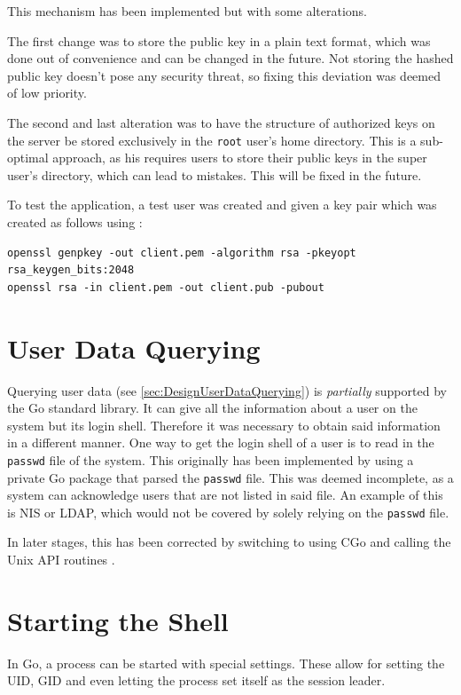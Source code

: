 \documentclass[10pt,a4paper,titlepage,twoside,english,final]{zhawreprt}
\begin{document}
This mechanism has been implemented but with some alterations.

The first change was to store the public key in a plain text format, which was done out of convenience and can be changed in the future.
Not storing the hashed public key doesn't pose any security threat, so fixing this deviation was deemed of low priority.

The second and last alteration was to have the structure of authorized keys on the server be stored exclusively in the \texttt{root} user's home directory.
This is a sub-optimal approach, as his requires users to store their public keys in the super user's directory, which can lead to mistakes.
This will be fixed in the future.

To test the application, a test user was created and given a key pair which was created as follows using \cite{openssl}:

\setlistingBash
\begin{lstlisting}[caption={Generating a key pair for the client},label=lst:GenClientKeyPair,deletekeywords={in}]
openssl genpkey -out client.pem -algorithm rsa -pkeyopt rsa_keygen_bits:2048
openssl rsa -in client.pem -out client.pub -pubout
\end{lstlisting}

\section{User Data Querying}\label{sec:ImplUserDataQuerying}
Querying user data (see \ref{sec:DesignUserDataQuerying}) is \textit{partially} supported by the \gls{Go} standard library.
It can give all the information about a user on the system but its \gls{login} \gls{shell}.
Therefore it was necessary to obtain said information in a different manner.
One way to get the \gls{login} \gls{shell} of a user is to read in the \texttt{passwd} file of the system.
This originally has been implemented by using a private \gls{Go} package that parsed the \texttt{passwd} file.
This was deemed incomplete, as a system can acknowledge users that are not listed in said file.
An example of this is \gls{NIS} or \gls{LDAP}, which would not be covered by solely relying on the \texttt{passwd} file.

In later stages, this has been corrected by switching to using \gls{CGo} and calling the \gls{Unix} \gls{API} routines \cite{getpw}.

\section{Starting the Shell}\label{sec:ImplStartingTheShell}
In \gls{Go}, a process can be started with special settings.
These allow for setting the \gls{UID}, \gls{GID} and even letting the process set itself as the session leader.
\end{document}
